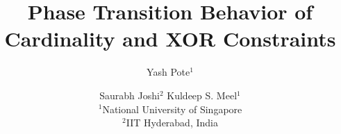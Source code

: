 \documentclass{article}
\title{Phase Transition Behavior of Cardinality and XOR Constraints}
\author{
	Yash Pote$^1$\and
	Saurabh Joshi$^2$\And
	Kuldeep S. Meel$^1$\\
	\affiliations
	$^1$National University of Singapore\\
	$^2$IIT Hyderabad, India\\
}
\begin{document}
\maketitle

\begin{abstract}
	
\end{abstract}







{\small
	
	
}
\end{document}
